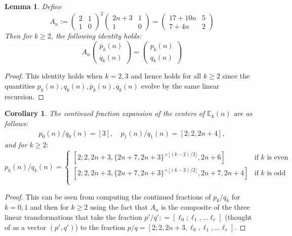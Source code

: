\documentclass[11pt, reqno]{amsart}
\newtheorem{lemma}[thm]{Lemma}
\newtheorem{cor}[thm]{Corollary}
\theoremstyle{remark}
\numberwithin{equation}{subsection}
\numberwithin{figure}{section}
\theoremstyle{customremark}
\newcommand{\bE}{{\mathbb E}}
\newcommand{\ov}{\overline}
\begin{document}
\begin{lemma} \label{lem:matrix} Define \[ A_n:= \begin{pmatrix} 2 & 1 \\ 1 & 0 \end{pmatrix}^2 \begin{pmatrix} 2n+3 & 1 \\ 1& 0 \end{pmatrix} 
=\begin{pmatrix} 17+10n & 5 \\ 7+4n & 2 \end{pmatrix}\] 
Then for $k \geq 2$, the
 following identity holds:
  \[ A_n\begin{pmatrix} \ov{p}_k(n) \\ \ov{q}_k(n) \end{pmatrix}=\begin{pmatrix} p_k(n) \\ q_k(n) \end{pmatrix}\]
\end{lemma}
\begin{proof}
This identity holds when $k=2,3$ and hence holds for all $k \geq 2$ since  the quantities $p_k(n),q_k(n), \ov{p}_k(n), \ov{q}_k(n)$
evolve by the same linear recursion.
\end{proof}

\begin{cor}  \label{cor:CFEnk}
    The continued fraction expansion of the centers of $\bE_k(n)$ are as follows:
    \begin{align*} p_0(n)/q_0(n)=[3], \quad p_1(n)/q_1(n)=[2;2,2n+4], 
    \end{align*}
    and for $k \geq 2:$
    \[  p_k(n)/q_k(n)=\begin{cases} 
    [2;2,2n+3,\{2n+7,2n+3\}^{\times \lfloor(k-2)/2\rfloor},2n+6] & \text{if $k$ is even} \\
   [2;2,2n+3,\{2n+7,2n+3\}^{\times \lfloor (k-2)/2\rfloor},2n+7,2n+4] & \text{if $k$ is odd} \\
    \end{cases}
    \]
\end{cor}
\begin{proof}
    This can be seen from computing the continued fractions of $p_k/q_k$ for $k=0,1$ and then 
for $k \geq 2$ using the fact that $A_n$ is the composite of the three  linear transformations that take  the fraction $p'/q': = [\ell_0;\ell_1,\dots\ell_r]$
(thought of as a vector  $(p',q')$) to the fraction $p/q = [2;2,2n+3,\ell_0,\ell_1,\dots\ell_r]$.
\end{proof}
\end{document}
